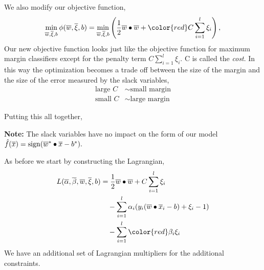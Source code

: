 \documentclass[a4paper,blends,pdf,colorBG,slideColor]{prosper}
\begin{document}
We also modify our objective function,
\begin{equation*}
\min_{\ol{w},\ol{\xi},b} \phi(\ol{w},\ol{\xi},b) 
	=  \min_{\ol{w},\ol{\xi},b}  \left( \frac{1}{2}\ol{w}\bullet\ol{w} + {\color{red}C \sum_{i=1}^{l}\xi_i}\right),
\end{equation*}
Our new objective function looks just like the objective function for maximum margin classifiers
except for the penalty term  $C \sum_{i=1}^{l}\xi_i$.  C is called the {\em cost}. In this way the optimization becomes a trade off between the size of the margin and the size of the error measured by the slack variables,
\begin{equation*}
\boxed{
\begin{aligned}
\text{large $C$} &\sim \text{small margin}\\
\text{small $C$} &\sim \text{large margin}
\end{aligned}
}
\end{equation*}
\es

\small
Putting this all together,

\vspace{.2in}
{\bf Note:} The slack variables have no impact on the form of our model
$
\model{f}(\ol{x}) = \sign(\ol{w}^*\bullet\ol{x} -b^*).
$

\es

\small
As before we start by constructing the Lagrangian,
\begin{equation*}
\begin{split}
L(\ol{\alpha},\ol{\beta},\ol{w},\ol{\xi},b) & =
	\frac{1}{2}\ol{w}\bullet\ol{w} + C \sum_{i=1}^{l}\xi_i \\
	& \quad - \sum_{i=1}^l\alpha_i (y_i(\ol{w}\bullet\ol{x}_i - b) + \xi_i -1) \\
	& \quad - \sum_{i=1}^l{\color{red}\beta_i}\xi_i
\end{split}
\end{equation*}
We have an additional set of Lagrangian multipliers for the additional constraints.
\end{document}
